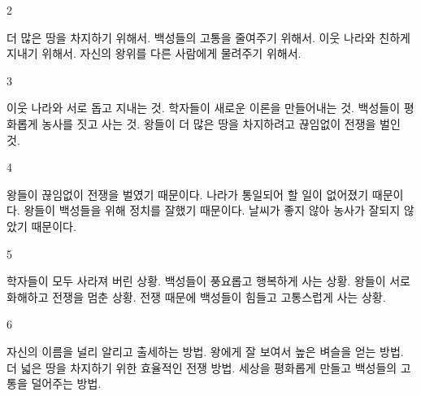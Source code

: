 \documentclass[fs9,seriesFre]{korfarm-base}
\begin{document}
\begin{kfSentenceUnit}{2}{}
\begin{kfChoices}
\kfChoice 더 많은 땅을 차지하기 위해서.
\kfChoice 백성들의 고통을 줄여주기 위해서.
\kfChoice 이웃 나라와 친하게 지내기 위해서.
\kfChoice 자신의 왕위를 다른 사람에게 물려주기 위해서.
\end{kfChoices}
\end{kfSentenceUnit}

\begin{kfSentenceUnit}{3}{}
\begin{kfChoices}
\kfChoice 이웃 나라와 서로 돕고 지내는 것.
\kfChoice 학자들이 새로운 이론을 만들어내는 것.
\kfChoice 백성들이 평화롭게 농사를 짓고 사는 것.
\kfChoice 왕들이 더 많은 땅을 차지하려고 끊임없이 전쟁을 벌인 것.
\end{kfChoices}
\end{kfSentenceUnit}

\begin{kfSentenceUnit}{4}{}
\begin{kfChoices}
\kfChoice 왕들이 끊임없이 전쟁을 벌였기 때문이다.
\kfChoice 나라가 통일되어 할 일이 없어졌기 때문이다.
\kfChoice 왕들이 백성들을 위해 정치를 잘했기 때문이다.
\kfChoice 날씨가 좋지 않아 농사가 잘되지 않았기 때문이다.
\end{kfChoices}
\end{kfSentenceUnit}

\begin{kfSentenceUnit}{5}{}
\begin{kfChoices}
\kfChoice 학자들이 모두 사라져 버린 상황.
\kfChoice 백성들이 풍요롭고 행복하게 사는 상황.
\kfChoice 왕들이 서로 화해하고 전쟁을 멈춘 상황.
\kfChoice 전쟁 때문에 백성들이 힘들고 고통스럽게 사는 상황.
\end{kfChoices}
\end{kfSentenceUnit}

\begin{kfSentenceUnit}{6}{}
\begin{kfChoices}
\kfChoice 자신의 이름을 널리 알리고 출세하는 방법.
\kfChoice 왕에게 잘 보여서 높은 벼슬을 얻는 방법.
\kfChoice 더 넓은 땅을 차지하기 위한 효율적인 전쟁 방법.
\kfChoice 세상을 평화롭게 만들고 백성들의 고통을 덜어주는 방법.
\end{kfChoices}
\end{kfSentenceUnit}
\end{document}
